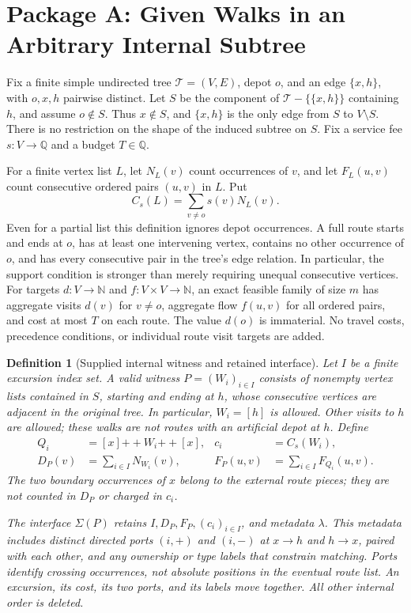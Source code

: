 \documentclass[11pt]{article}
\newtheorem{definition}{Definition}[section]
\theoremstyle{remark}
\newcommand{\N}{\mathbb N}
\newcommand{\Q}{\mathbb Q}
\newcommand{\cat}{\mathbin{+\!+}}
\begin{document}
\section{Package A: Given Walks in an Arbitrary Internal Subtree}
\label{sec:package-a}

Fix a finite simple undirected tree $\mathcal T=(V,E)$, depot $o$, and an edge
$\{x,h\}$, with $o,x,h$ pairwise distinct. Let $S$ be the component of
$\mathcal T-\{\{x,h\}\}$ containing $h$, and assume $o\notin S$.
Thus $x\notin S$, and $\{x,h\}$ is the only edge from $S$ to $V\setminus S$.
There is no restriction on the shape of the induced subtree on $S$.
Fix a service fee $s:V\to\Q$ and a budget $T\in\Q$.

For a finite vertex list $L$, let $N_L(v)$ count occurrences of $v$, and let
$F_L(u,v)$ count consecutive ordered pairs $(u,v)$ in $L$. Put
\[
 C_s(L)=\sum_{v\ne o}s(v)N_L(v).
\]
Even for a partial list this definition ignores depot occurrences. A full
route starts and ends at $o$, has at least one intervening vertex, contains no
other occurrence of $o$, and has every consecutive pair in the tree's edge
relation. In particular, the support condition is stronger than merely
requiring unequal consecutive vertices. For targets $d:V\to\N$ and
$f:V\times V\to\N$, an exact feasible family of size $m$ has aggregate visits
$d(v)$ for $v\ne o$, aggregate flow $f(u,v)$ for all ordered pairs, and cost at
most $T$ on each route. The value $d(o)$ is immaterial. No travel costs,
precedence conditions, or individual route visit targets are added.

\begin{definition}[Supplied internal witness and retained interface]
\label{def:interface}
Let $I$ be a finite excursion index set. A valid witness $P=(W_i)_{i\in I}$
consists of nonempty vertex lists contained in $S$, starting and ending at $h$,
whose consecutive vertices are adjacent in the original tree. In particular,
$W_i=[h]$ is allowed. Other visits to $h$ are allowed; these walks are not
routes with an artificial depot at $h$. Define
\begin{align*}
 Q_i&=[x]\cat W_i\cat[x], & c_i&=C_s(W_i),\\
 D_P(v)&=\sum_{i\in I}N_{W_i}(v), &
 F_P(u,v)&=\sum_{i\in I}F_{Q_i}(u,v).
\end{align*}
The two boundary occurrences of $x$ belong to the external route pieces;
they are not counted in $D_P$ or charged in $c_i$.

The interface $\Sigma(P)$ retains $I,D_P,F_P,(c_i)_{i\in I}$, and metadata
$\lambda$. This metadata includes distinct directed ports $(i,+)$ and $(i,-)$
at $x\to h$ and $h\to x$, paired with each other, and any ownership or type
labels that constrain matching. Ports identify crossing occurrences, not
absolute positions in the eventual route list. An excursion, its cost, its
two ports, and its labels move together. All other internal order is deleted.
\end{definition}
\end{document}
